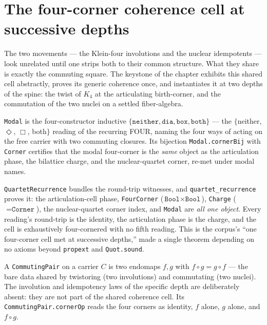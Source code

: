 \section{The four-corner coherence cell at successive depths}

The two movements --- the Klein-four involutions and the nuclear idempotents --- look unrelated until one strips both to their common structure. What they share is exactly the commuting square. The keystone of the chapter exhibits this shared cell abstractly, proves its generic coherence once, and instantiates it at two depths of the spine: the twist of $K_4$ at the articulating birth-corner, and the commutation of the two nuclei on a settled fiber-algebra.

\begin{theorem}\label{def:modal}\leanok{}
\texttt{Modal} is the four-constructor inductive $\{\texttt{neither}, \texttt{dia}, \texttt{box}, \texttt{both}\}$ --- the $\{$neither, $\Diamond$, $\Box$, both$\}$ reading of the recurring FOUR, naming the four ways of acting on the free carrier with two commuting closures. Its bijection \texttt{Modal.cornerBij} with \texttt{Corner} certifies that the modal four-corner is the \emph{same} object as the articulation phase, the bilattice charge, and the nuclear-quartet corner, re-met under modal names.
\end{theorem}

\begin{theorem}\label{thm:quartet-recurrence}\leanok{}
\texttt{QuartetRecurrence} bundles the round-trip witnesses, and \texttt{quartet\_recurrence} proves it: the articulation-cell phase, \texttt{FourCorner} ($\texttt{Bool} \times \texttt{Bool}$), \texttt{Charge} ($=\texttt{Corner}$), the nuclear-quartet corner index, and \texttt{Modal} are \emph{all one object}. Every reading's round-trip is the identity, the articulation phase is the charge, and the cell is exhaustively four-cornered with no fifth reading. This is the corpus's ``one four-corner cell met at successive depths,'' made a single theorem depending on no axioms beyond \texttt{propext} and \texttt{Quot.sound}.
\end{theorem}

\begin{definition}\label{def:commuting-pair}\leanok{}
A \texttt{CommutingPair} on a carrier $C$ is two endomaps $f, g$ with $f \circ g = g \circ f$ --- the bare data shared by twistoring (two involutions) and commutating (two nuclei). The involution and idempotency laws of the specific depth are deliberately absent: they are not part of the shared coherence cell. Its \texttt{CommutingPair.cornerOp} reads the four corners as identity, $f$ alone, $g$ alone, and $f \circ g$.
\end{definition}

